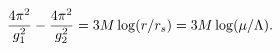 \begin{equation}\label{betadiff}
{4\pi^2\over g_1^2} - {4\pi^2\over g_2^2}= 3 M \log (r/r_s)=3 M \log(\mu/\Lambda).
\end{equation} 
